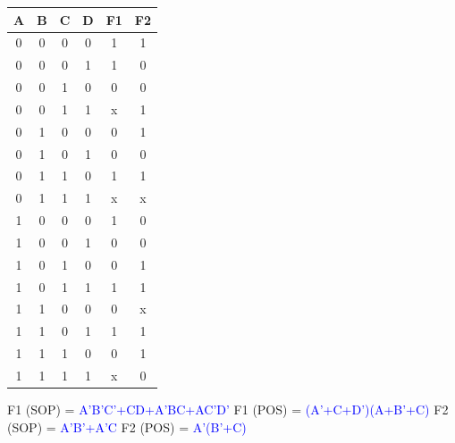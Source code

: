 \documentclass{article}
\begin{document}
\begin{enumerate}[label=(\alph*)]
        \begin{multicols}{2}
        \begin{center}
        \scalebox{1.2} {
            \begin{tabular}{|c|c|c|c||c|c|}
            \hline
            A & B & C & D & F1 & F2 \\
            \hline
            0 & 0 & 0 & 0 & 1 & 1 \\
            0 & 0 & 0 & 1 & 1 & 0 \\
            0 & 0 & 1 & 0 & 0 & 0 \\
            0 & 0 & 1 & 1 & x & 1 \\
            0 & 1 & 0 & 0 & 0 & 1 \\
            0 & 1 & 0 & 1 & 0 & 0 \\
            0 & 1 & 1 & 0 & 1 & 1 \\
            0 & 1 & 1 & 1 & x & x \\
            1 & 0 & 0 & 0 & 1 & 0 \\
            1 & 0 & 0 & 1 & 0 & 0 \\
            1 & 0 & 1 & 0 & 0 & 1 \\
            1 & 0 & 1 & 1 & 1 & 1 \\
            1 & 1 & 0 & 0 & 0 & x \\
            1 & 1 & 0 & 1 & 1 & 1 \\
            1 & 1 & 1 & 0 & 0 & 1 \\
            1 & 1 & 1 & 1 & x & 0 \\
            \hline
            \end{tabular}
        }
        \end{center}
        \columnbreak
        F1 (SOP) = \textcolor{blue}{A'B'C'+CD+A'BC+AC'D'}
        \newline
        \newline
        F1 (POS) = \textcolor{blue}{(A’+C+D’)(A+B’+C)}
        \newline
        \newline
        F2 (SOP) = \textcolor{blue}{A’B’+A’C}
        \newline
        \newline
        F2 (POS) = \textcolor{blue}{A’(B’+C)}
        \newline
        \newline
        \end{multicols}
    \newpage
\end{enumerate}
\end{document}
